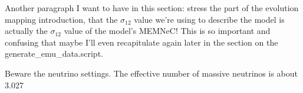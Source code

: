 
Another paragraph I want to have in this section: stress the part of the evolution mapping introduction, that the $\sigma_{12}$ value we're using to describe the model is actually the $\sigma_{12}$ value of the model's MEMNeC! This is so important and confusing that maybe I'll even recapitulate again later in the section on the generate\_emu\_data.script.


Beware the neutrino settings. The effective number of massive neutrinos is about 3.027
